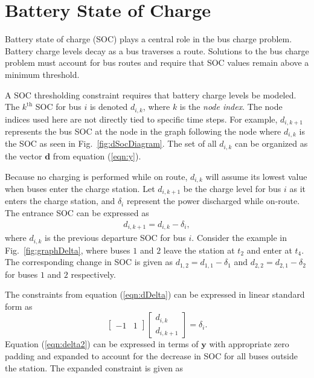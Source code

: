 \section{Battery State of Charge}
Battery state of charge (SOC) plays a central role in the bus charge
problem. Battery charge levels decay as a bus traverses a
route. Solutions to the bus charge problem must account for bus routes
and require that SOC values remain above a minimum threshold.
\par A SOC thresholding constraint requires that battery charge levels
be modeled. The $k^{\text{th}}$ SOC for bus $i$ is denoted $d_{i,k}$,
where $k$ is the \textit{node index}. The node indices used here are
not directly tied to specific time steps.  For example, $d_{i,k+1}$
represents the bus SOC at the node in the graph following the node
where $d_{i,k}$ is the SOC as seen in Fig.~\ref{fig:dSocDiagram}. The set of all $d_{i,k}$ can be organized as the vector $\mathbf{d}$ from equation (\ref{eqn:y}).
\par Because no charging is performed while on route, $d_{i,k}$ will
assume its lowest value when buses enter the charge station. Let $d_{i,k+1}$ be the charge level for bus $i$ as it enters the charge station, and $\delta_i$ represent the power discharged while on-route. The entrance SOC can be expressed as 
\begin{align}\label{eqn:dDelta}
	d_{i,k+1} = d_{i,k} - \delta_i,
\end{align}
where $d_{i,k}$ is the previous departure SOC for bus $i$. Consider the example in Fig.~\ref{fig:graphDelta}, where buses $1$ and $2$ leave the station at $t_2$ and enter at $t_4$. The corresponding change in SOC is given as $d_{1,2} = d_{1,1} - \delta_1$ and $d_{2,2} = d_{2,1} - \delta_2$ for buses $1$ and $2$ respectively.

The constraints from equation (\ref{eqn:dDelta}) can be expressed in linear standard form as 
\begin{equation}\label{eqn:delta2}
	\begin{bmatrix}
		-1 & 1
	\end{bmatrix}
	\begin{bmatrix}
		d_{i,k} \\ d_{i,k+1}
	\end{bmatrix} = \delta_i.
\end{equation}
Equation (\ref{eqn:delta2}) can be expressed in terms of $\mathbf{y}$ with appropriate zero padding and expanded to account for the decrease in SOC for all buses outside the station. The expanded constraint is given as 
